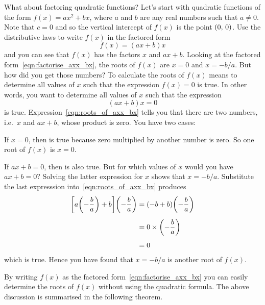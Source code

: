 \documentclass[a4paper,oneside,12pt]{article}
\begin{document}
What about factoring quadratic functions?  Let's start with quadratic
functions of the form $f(x) = ax^2 + bx$, where $a$ and $b$ are any
real numbers such that $a \neq 0$.  Note that $c = 0$ and so the
vertical intercept of $f(x)$ is the point $\left\lparen{0},\, {0}\right\rparen$.  Use the
distributive laws to write $f(x)$ in the factored form
\begin{equation}
\label{eqn:factorise_axx_bx}
f(x)
=
(ax + b)x
\end{equation}
and you can see that $f(x)$ has the factors $x$ and $ax + b$.  Looking
at the factored form~\eqref{eqn:factorise_axx_bx}, the roots of $f(x)$
are $x = 0$ and $x = -b/a$.  But how did you get those numbers?  To
calculate the roots of $f(x)$ means to determine all values of $x$
such that the expression $f(x) = 0$ is true.  In other words, you want
to determine all values of $x$ such that the expression
\begin{equation}
\label{eqn:roots_of_axx_bx}
(ax + b)x
=
0
\end{equation}
is true.  Expression~\eqref{eqn:roots_of_axx_bx} tells you that there
are two numbers, i.e.~$x$ and $ax + b$, whose product is zero.  You
have two cases:
\begin{packedenumeral}
\item If $x = 0$, then  is true
  because zero multiplied by another number is zero.  So one root of
  $f(x)$ is $x = 0$.

\item If $ax + b = 0$, then  is also
  true.  But for which values of $x$ would you have $ax + b = 0$?
  Solving the latter expression for $x$ shows that $x = -b / a$.
  Substitute the last expresssion into~\eqref{eqn:roots_of_axx_bx}
  produces
  \begin{align*}
  \squarebracket*{
    a \parenthesis*{-\frac{b}{a}}
    +
    b
  }
  \parenthesis*{-\frac{b}{a}}
  &=
  (-b + b)
  \parenthesis*{-\frac{b}{a}} \\[4pt]
  &=
  0 \times \parenthesis*{-\frac{b}{a}} \\[4pt]
  &=
  0
  \end{align*}
  which is true.  Hence you have found that $x = -b / a$ is another
  root of $f(x)$.
\end{packedenumeral}
By writing $f(x)$ as the factored form~\eqref{eqn:factorise_axx_bx}
you can easily determine the roots of $f(x)$ without using the
quadratic formula.  The above discussion is summarised in the
following theorem.
\end{document}
